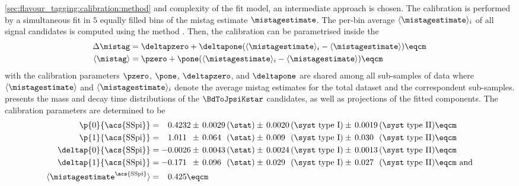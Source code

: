 \cref{sec:flavour_tagging:calibration:method} and complexity of the fit model,
an intermediate approach is chosen. The calibration is performed by a
simultaneous fit in $\num{5}$ equally filled bins of the mistag estimate
$\mistagestimate$. The per-bin average $\langle\mistagestimate\rangle_i$ of all
signal candidates is computed using the \splot method \cite{Pivk:2004ty}. Then,
the calibration can be parametrised inside the \PDF
%
\begin{equation}
  \begin{split}
    \Delta\mistag         &= \deltapzero + \deltapone ( \langle\mistagestimate\rangle_i - \langle\mistagestimate\rangle )\eqcm \\
    \langle\mistag\rangle &= \pzero + \pone ( \langle\mistagestimate\rangle_i - \langle\mistagestimate\rangle )\eqcm
  \end{split}
\end{equation}
%
with the calibration parameters $\pzero$, $\pone$, $\deltapzero$, and
$\deltapone$ are shared among all sub-samples of data where
$\langle\mistagestimate\rangle$ and $\langle\mistagestimate\rangle_i$ denote the
average mistag estimates for the total dataset and the correspondent
sub-samples.  presents the mass and
decay time distributions of the $\BdToJpsiKstar$ candidates, as well as
projections of the fitted \PDF components. The calibration parameters are
determined to be
%
\begin{equation}\label{eq:flavour_tagging:calibration:ss:parameters}
  \begin{split}
    \p{0}{\text{\acs{SSpi}}}        &= \phantom{+}0.4232 \pm\, 
                                       0.0029 \text{\,(\stat)} \pm\, 
                                       0.0020 \text{\,(\syst type I)} \pm\, 
                                       0.0019 \text{\,(\syst type II)} \eqcm\\ %
    \p{1}{\text{\acs{SSpi}}}        &= \phantom{+}1.011\phantom{0} \pm\, 
                                       0.064\phantom{0} \text{\,(\stat)} \pm\, 
                                       0.009\phantom{0} \text{\,(\syst type I)} \pm\, 
                                       0.030\phantom{0} \text{\,(\syst type II)} \eqcm\\ %
    \deltap{0}{\text{\acs{SSpi}}} &= -0.0026 \pm\, 
                                      0.0043 \text{\,(\stat)} \pm\, 
                                      0.0024 \text{\,(\syst type I)} \pm\, 
                                      0.0013 \text{\,(\syst type II)} \eqcm \\
    \deltap{1}{\text{\acs{SSpi}}} &= -0.171\phantom{0} \pm\, 
                                      0.096\phantom{0} \text{\,(\stat)} \pm\, 
                                      0.029\phantom{0} \text{\,(\syst type I)} \pm\, 
                                      0.027\phantom{0} \text{\,(\syst type II)} \eqcm\text{ and} \\
    \langle\mistagestimate^{\text{\acs{SSpi}}}\rangle &= \phantom{+}0.425 \eqcm
  \end{split}
\end{equation}
